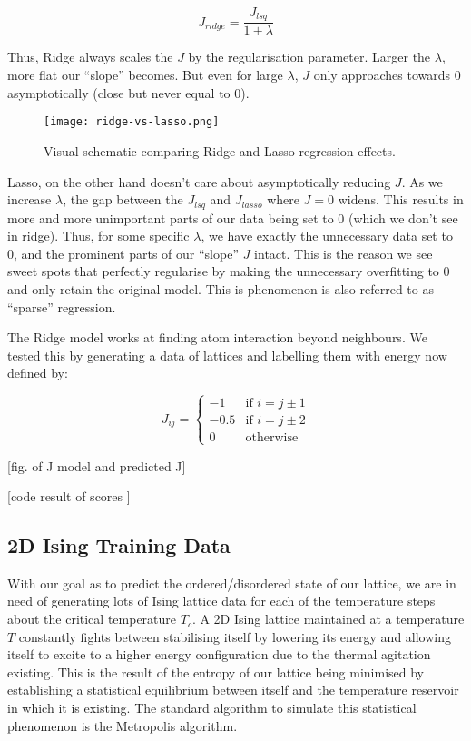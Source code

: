\[J_{ridge}=\frac{J_{lsq}}{1+\lambda}\]

Thus, Ridge always scales the $J$ by the regularisation parameter.
Larger the \(\lambda\), more flat our ``slope'' becomes.
But even for large \(\lambda\), $J$ only approaches towards 0 asymptotically (close but never equal to 0).

\begin{figure}[h!]
    \centering
    \texttt{[image: ridge-vs-lasso.png]}
    \caption{Visual schematic comparing Ridge and Lasso regression effects.}
\end{figure}

Lasso, on the other hand doesn't care about asymptotically reducing $J$.
As we increase \(\lambda\), the gap between the \(J_{lsq}\) and \(J_{lasso}\) where $J=0$ widens.
This results in more and more unimportant parts of our data being set to 0 (which we don't see in ridge).
Thus, for some specific \(\lambda\), we have exactly the unnecessary data set to 0, and the prominent parts of our ``slope'' $J$ intact.
This is the reason we see sweet spots that perfectly regularise by making the unnecessary overfitting to 0 and only retain the original model.
This is phenomenon is also referred to as ``sparse'' regression.

The Ridge model works at finding atom interaction beyond neighbours. We tested this by generating a data of lattices and labelling them with energy now defined by:

\begin{equation*}
    J_{ij} = \left\{
        \begin{array}{ll}
            -1 & \mbox{if } i = j \pm 1\\
            -0.5 & \mbox{if } i = j \pm 2\\
            0 & \mbox{otherwise}
        \end{array}
    \right.
\end{equation*}

[fig. of J model and predicted J]

[code result of scores ]

\subsection{2D Ising Training Data}
With our goal as to predict the ordered/disordered state of our lattice, we are in need of generating lots of Ising lattice data for each of the temperature steps about the critical temperature \(T_c\).
A 2D Ising lattice maintained at a temperature $T$ constantly fights between stabilising itself by lowering its energy and allowing itself to excite to a higher energy configuration due to the thermal agitation existing.
This is the result of the entropy of our lattice being minimised by establishing a statistical equilibrium between itself and the temperature reservoir in which it is existing.
The standard algorithm to simulate this statistical phenomenon is the Metropolis algorithm.

